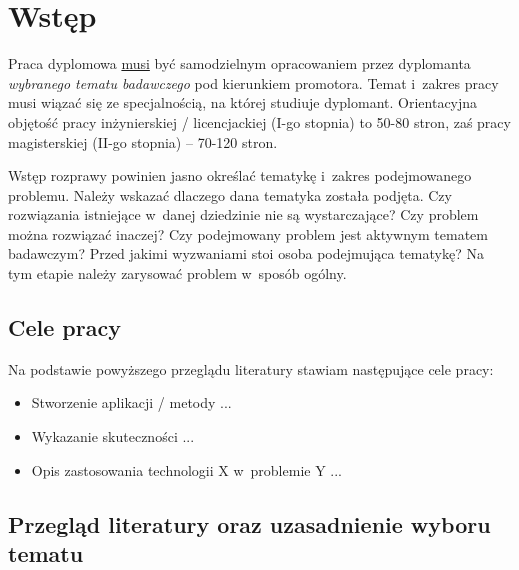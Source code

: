 \chapter{Wstęp}


Praca dyplomowa \underline{musi} być samodzielnym opracowaniem przez dyplomanta
\emph{wybranego tematu badawczego} pod kierunkiem promotora.  Temat i~zakres
pracy musi wiązać się ze specjalnością, na której studiuje dyplomant.
Orientacyjna objętość pracy inżynierskiej / licencjackiej (I-go stopnia) to
50-80 stron, zaś pracy magisterskiej (II-go stopnia) -- 70-120
stron.

Wstęp rozprawy powinien jasno określać tematykę i~zakres podejmowanego problemu.
Należy wskazać dlaczego dana tematyka została podjęta. Czy rozwiązania
istniejące w~danej dziedzinie nie są wystarczające? Czy problem można rozwiązać
inaczej? Czy podejmowany problem jest aktywnym tematem badawczym? Przed jakimi
wyzwaniami stoi osoba podejmująca tematykę? Na tym etapie należy zarysować
problem w~sposób ogólny.

\section{Cele pracy}\label{sec:cele_pracy}

Na podstawie powyższego przeglądu literatury stawiam następujące cele pracy:

\begin{itemize}
 \item Stworzenie aplikacji / metody ...
 \item Wykazanie skuteczności ...
 \item Opis zastosowania technologii X w~problemie Y ...
\end{itemize}



\section{Przegląd literatury oraz uzasadnienie wyboru tematu}

